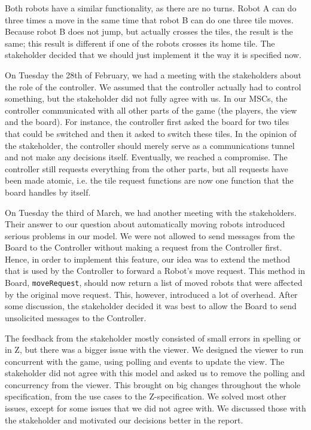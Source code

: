 \bigskip
Both robots have a similar functionality, as there are no turns. Robot A can do three times a move in the same time that robot B can do one three tile moves. Because robot B does not jump, but actually crosses the tiles, the result is the same; this result is different if one of the robots crosses its home tile. The stakeholder decided that we should just implement it the way it is specified now.

On Tuesday the 28th of February, we had a meeting with the stakeholders about the role of the controller. We assumed that the controller actually had to control something, but the stakeholder did not fully agree with us. In our MSCs, the controller communicated with all other parts of the game (the players, the view and the board). For instance, the controller first asked the board for two tiles that could be switched and then it asked to switch these tiles. In the opinion of the stakeholder, the controller should merely serve as a communications tunnel and not make any decisions itself. Eventually, we reached a compromise. The controller still requests everything from the other parts, but all requests have been made atomic, i.e. the tile request functions are now one function that the board handles by itself.

On Tuesday the third of March, we had another meeting with the stakeholders. Their answer to our question about automatically moving robots introduced serious problems in our model. We were not allowed to send messages from the Board to the Controller without making a request from the Controller first. Hence, in order to implement this feature, our idea was to extend the method that is used by the Controller to forward a Robot's move request. This method in Board, \texttt{moveRequest}, should now return a list of moved robots that were affected by the original move request. This, however, introduced a lot of overhead. After some discussion, the stakeholder decided it was best to allow the Board to send unsolicited messages to the Controller. 

The feedback from the stakeholder mostly consisted of small errors in spelling or in Z, but there was a bigger issue with the viewer. We designed the viewer to run concurrent with the game, using polling and events to update the view. The stakeholder did not agree with this model and asked us to remove the polling and concurrency from the viewer. This brought on big changes throughout the whole specification, from the use cases to the Z-specification. We solved most other issues, except for some issues that we did not agree with. We discussed those with the stakeholder and motivated our decisions better in the report.
